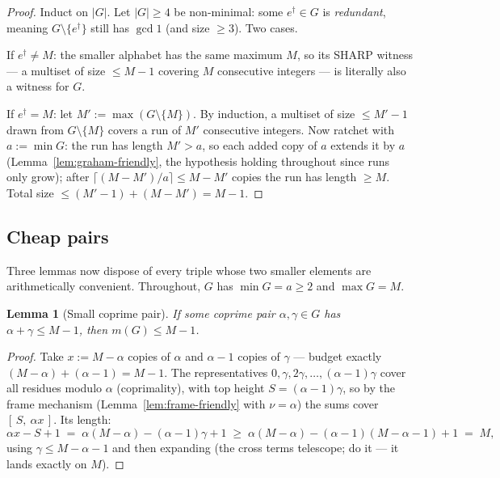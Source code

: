 \documentclass[11pt,reqno]{amsart}
\theoremstyle{plain}
\newtheorem{lemma}[theorem]{Lemma}
\theoremstyle{definition}
\theoremstyle{remark}
\begin{document}
\begin{proof}
Induct on $|G|$. Let $|G| \ge 4$ be non-minimal: some $e^\dagger \in G$ is
\emph{redundant}, meaning $G \setminus \{e^\dagger\}$ still has $\gcd 1$ (and size
$\ge 3$). Two cases.

If $e^\dagger \ne M$: the smaller alphabet has the same maximum $M$, so its SHARP
witness --- a multiset of size $\le M-1$ covering $M$ consecutive integers --- is
literally also a witness for $G$.

If $e^\dagger = M$: let $M' := \max(G \setminus \{M\})$. By induction, a multiset
of size $\le M' - 1$ drawn from $G \setminus \{M\}$ covers a run of $M'$
consecutive integers. Now ratchet with $a := \min G$: the run has length $M' > a$,
so each added copy of $a$ extends it by $a$ (Lemma~\ref{lem:graham-friendly}, the
hypothesis holding throughout since runs only grow); after $\lceil (M - M')/a
\rceil \le M - M'$ copies the run has length $\ge M$. Total size $\le (M' - 1) +
(M - M') = M - 1$.
\end{proof}

\subsection{Cheap pairs}

Three lemmas now dispose of every triple whose two smaller elements are
arithmetically convenient. Throughout, $G$ has $\min G = a \ge 2$ and $\max G = M$.

\begin{lemma}[Small coprime pair]\label{lem:L1-friendly}
If some coprime pair $\alpha, \gamma \in G$ has $\alpha + \gamma \le M - 1$, then
$m(G) \le M - 1$.
\end{lemma}

\begin{proof}
Take $x := M - \alpha$ copies of $\alpha$ and $\alpha - 1$ copies of $\gamma$ ---
budget exactly $(M - \alpha) + (\alpha - 1) = M - 1$. The representatives
$0, \gamma, 2\gamma, \dots, (\alpha-1)\gamma$ cover all residues modulo $\alpha$
(coprimality), with top height $S = (\alpha - 1)\gamma$, so by the frame mechanism
(Lemma~\ref{lem:frame-friendly} with $\nu = \alpha$) the sums cover
$[\,S,\ \alpha x\,]$. Its length:
\[
  \alpha x - S + 1 \;=\; \alpha(M - \alpha) - (\alpha-1)\gamma + 1
  \;\ge\; \alpha(M{-}\alpha) - (\alpha{-}1)(M{-}\alpha{-}1) + 1 \;=\; M ,
\]
using $\gamma \le M - \alpha - 1$ and then expanding (the cross terms telescope;
do it --- it lands exactly on $M$).
\end{proof}
\end{document}
